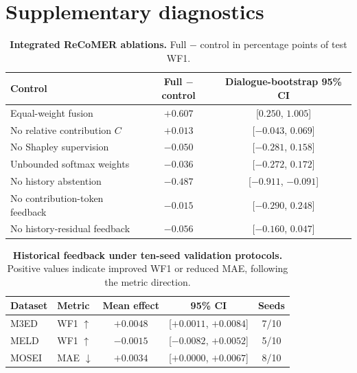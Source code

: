 \documentclass[10pt,twocolumn,letterpaper]{article}
\begin{document}
{
  \small
  
  
}

\appendix
\section{Supplementary diagnostics}
\label{sec:appendix}


\begin{table}[h]
  \centering
  \caption{\textbf{Integrated ReCoMER ablations.}
  Full $-$ control in percentage points of test WF1.}
  \label{tab:ablation}
  \small
  \setlength{\tabcolsep}{4pt}
  \begin{tabular}{lcc}
    \toprule
    Control & Full $-$ control & Dialogue-bootstrap 95\% CI \\
    \midrule
    Equal-weight fusion & $+0.607$ & [$0.250$, $1.005$] \\
    No relative contribution $C$ & $+0.013$ & [$-0.043$, $0.069$] \\
    No Shapley supervision & $-0.050$ & [$-0.281$, $0.158$] \\
    Unbounded softmax weights & $-0.036$ & [$-0.272$, $0.172$] \\
    No history abstention & $-0.487$ & [$-0.911$, $-0.091$] \\
    No contribution-token feedback & $-0.015$ & [$-0.290$, $0.248$] \\
    No history-residual feedback & $-0.056$ & [$-0.160$, $0.047$] \\
    \bottomrule
  \end{tabular}
\end{table}

\begin{table}[h]
  \centering
  \caption{\textbf{Historical feedback under ten-seed validation protocols.}
  Positive values indicate improved WF1 or reduced MAE, following the metric direction.}
  \label{tab:history}
  \small
  \begin{tabular}{llccc}
    \toprule
    Dataset & Metric & Mean effect & 95\% CI & Seeds \\
    \midrule
    M3ED & WF1 $\uparrow$ & $+0.0048$ & [$+0.0011$, $+0.0084$] & 7/10 \\
    MELD & WF1 $\uparrow$ & $-0.0015$ & [$-0.0082$, $+0.0052$] & 5/10 \\
    MOSEI & MAE $\downarrow$ & $+0.0034$ & [$+0.0000$, $+0.0067$] & 8/10 \\
    \bottomrule
  \end{tabular}
\end{table}
\end{document}
